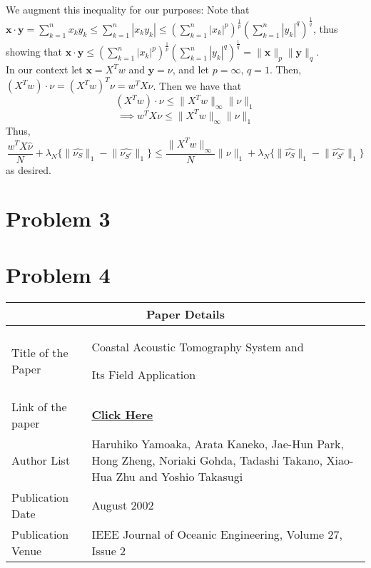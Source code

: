 \documentclass[a4paper,11pt]{article}
\numberwithin{definition}{section}
\numberwithin{mytheorem}{subsection}
\begin{document}
We augment this inequality for our purposes: Note that $\boldsymbol{x}\cdot\boldsymbol{y} = \sum^{n}_{k = 1}x_ky_k \leq \sum^{n}_{k = 1}|x_ky_k| \leq (\sum^{n}_{k = 1}|x_k|^p)^{\frac{1}{p}}(\sum^{n}_{k = 1}|y_k|^q)^{\frac{1}{q}}$, thus showing that $\boldsymbol{x}\cdot\boldsymbol{y}\leq (\sum^{n}_{k = 1}|x_k|^p)^{\frac{1}{p}}(\sum^{n}_{k = 1}|y_k|^q)^{\frac{1}{q}} = \lVert \boldsymbol{x}\rVert_p\lVert \boldsymbol{y}\rVert_q$.\\
In our context let $\boldsymbol{x} = X^Tw$ and $\boldsymbol{y} = \nu$, and let $p =\infty$, $q = 1$. Then, $(X^Tw)\cdot\nu = (X^Tw)^T\nu = w^TX\nu$. Then we have that 
$$(X^Tw)\cdot\nu\leq \lVert X^Tw\rVert_{\infty}\lVert \nu\rVert_1$$
$$\implies w^TX\nu\leq \lVert X^Tw\rVert_{\infty}\lVert \nu\rVert_1$$
Thus, 
$$\frac{w^TX\hat{\nu}}{N} + \lambda_N\{\lVert\hat{\nu_S}\rVert_1 - \lVert\hat{\nu_{S^c}}\rVert_1\}\leq \frac{\lVert X^Tw\rVert_{\infty}}{N}\lVert \nu\rVert_1 + \lambda_N\{\lVert\hat{\nu_S}\rVert_1 - \lVert\hat{\nu_{S^c}}\rVert_1\}$$
as desired.\\

\section{Problem 3}


\section{Problem 4}


\begin{center}
    \begin{tabular}{ |p{3.5cm}||p{10cm}|}
   
    \hline
    \multicolumn{2}{|c|}{Paper Details} \\
    \hline
    Title of the Paper& Coastal Acoustic Tomography System and 
    
    Its Field Application\\
    \hline
    Link of the paper  &  \href{https://ieeexplore.ieee.org/document/1002483}{\textbf{Click Here}}  \\
    \hline
    Author List & Haruhiko Yamoaka, Arata Kaneko, Jae-Hun Park, Hong Zheng, Noriaki Gohda, Tadashi Takano, Xiao-Hua Zhu and Yoshio Takasugi \\
    \hline
    Publication Date  & August 2002 \\
    \hline
    Publication Venue  &  IEEE Journal of Oceanic Engineering, Volume 27, Issue 2 \\
    \hline
   \end{tabular}
\end{center}
\end{document}
